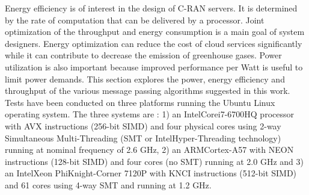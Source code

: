 Energy efficiency is of interest in the design of C-RAN servers. It is
determined by the rate of computation that can be delivered by a processor.
Joint optimization of the throughput and energy consumption is a main goal of
system designers. Energy optimization can reduce the cost of cloud services
significantly while it can contribute to decrease the emission of greenhouse
gases. Power utilization is also important because improved performance per Watt
is useful to limit power demands. This section explores the power, energy
efficiency and throughput of the various message passing algorithms suggested in
this work. Tests have been conducted on three platforms running the Ubuntu Linux
operating system. The three systems are : 1) an Intel\R Core\TM i7-6700HQ
processor with AVX instructions (256-bit SIMD) and four physical cores using
2-way Simultaneous Multi-Threading (SMT or Intel\R Hyper-Threading technology)
running at nominal frequency of 2.6 GHz, 2) an ARM\R Cortex-A57 with NEON
instructions (128-bit SIMD) and four cores (no SMT) running at 2.0 GHz and 3) an
Intel\R Xeon Phi\TM Knight-Corner 7120P with KNCI instructions (512-bit SIMD)
and 61 cores using 4-way SMT and running at 1.2 GHz.

